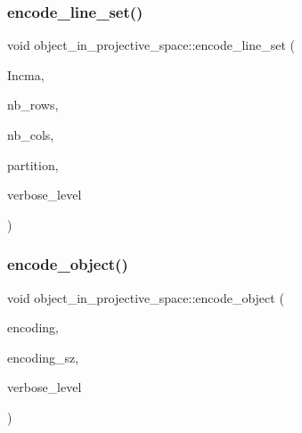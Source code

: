 \subsubsection{\texorpdfstring{encode\+\_\+line\+\_\+set()}{encode\_line\_set()}}
{\footnotesize\ttfamily void object\+\_\+in\+\_\+projective\+\_\+space\+::encode\+\_\+line\+\_\+set (\begin{DoxyParamCaption}\item[{\mbox{\hyperlink{galois_8h_a09fddde158a3a20bd2dcadb609de11dc}{I\+NT}} $\ast$\&}]{Incma,  }\item[{\mbox{\hyperlink{galois_8h_a09fddde158a3a20bd2dcadb609de11dc}{I\+NT}} \&}]{nb\+\_\+rows,  }\item[{\mbox{\hyperlink{galois_8h_a09fddde158a3a20bd2dcadb609de11dc}{I\+NT}} \&}]{nb\+\_\+cols,  }\item[{\mbox{\hyperlink{galois_8h_a09fddde158a3a20bd2dcadb609de11dc}{I\+NT}} $\ast$\&}]{partition,  }\item[{\mbox{\hyperlink{galois_8h_a09fddde158a3a20bd2dcadb609de11dc}{I\+NT}}}]{verbose\+\_\+level }\end{DoxyParamCaption})}

\mbox{\label{classobject__in__projective__space_a94a707237ade58291c1fc48f883c4930}} 
\subsubsection{\texorpdfstring{encode\+\_\+object()}{encode\_object()}}
{\footnotesize\ttfamily void object\+\_\+in\+\_\+projective\+\_\+space\+::encode\+\_\+object (\begin{DoxyParamCaption}\item[{\mbox{\hyperlink{galois_8h_a09fddde158a3a20bd2dcadb609de11dc}{I\+NT}} $\ast$\&}]{encoding,  }\item[{\mbox{\hyperlink{galois_8h_a09fddde158a3a20bd2dcadb609de11dc}{I\+NT}} \&}]{encoding\+\_\+sz,  }\item[{\mbox{\hyperlink{galois_8h_a09fddde158a3a20bd2dcadb609de11dc}{I\+NT}}}]{verbose\+\_\+level }\end{DoxyParamCaption})}

\mbox{\label{classobject__in__projective__space_a8fef74d42e906760c9c4a90254e75e3d}} 
